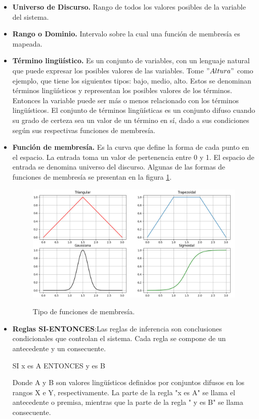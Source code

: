 \begin{itemize}
\item \textbf{Universo de Discurso.} Rango de todos los valores posibles de la variable del sistema.
\item \textbf{Rango o Dominio.} Intervalo sobre la cual una función de membresía es mapeada.
\item \textbf{Término lingüístico.} Es un conjunto de variables, con un lenguaje natural que puede expresar los posibles valores de las variables. Tome $"Altura"$ como ejemplo, que tiene los siguientes tipos: bajo, medio, alto. Estos se denominan términos lingüísticos y representan los posibles valores de los términos. Entonces la variable puede ser más o menos relacionado con los términos lingüísticos. El conjunto de términos lingüísticas es un conjunto difuso cuando su grado de certeza sea un valor de un término en sí, dado a sus condiciones según sus respectivas funciones de membresía.
\item \textbf{Función de membresía.} Es la curva que define la forma de cada punto en el espacio. La entrada toma un valor de pertenencia entre 0 y 1. El espacio de entrada se denomina universo del discurso. Algunas de las formas de funciones de membresía se presentan en la figura \ref{funcion}. 
\begin{figure}[!ht]
\centering
         \includegraphics[scale=0.55]{imgs/funciones.png} \\
    \caption{Tipo de funciones de membresía.} \label{funcion}
\end{figure}

\item \textbf{Reglas SI-ENTONCES}:Las reglas de inferencia son conclusiones condicionales que controlan el sistema. Cada regla se compone de un antecedente y un consecuente.
\begin{center}
SI x es A ENTONCES y es B
\end{center}

Donde A y B son valores lingüísticos definidos por conjuntos difusos en los rangos X e Y, respectivamente. La parte de la regla "x es A" se llama el antecedente o premisa, mientras que la parte de la regla " y es B" se llama consecuente. 
\end{itemize}
